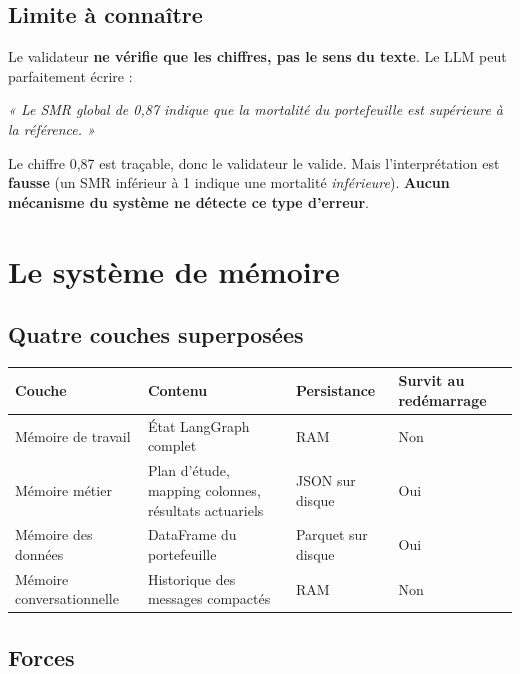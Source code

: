 \documentclass[12pt,a4paper]{article}
\begin{document}
\subsection{Limite à connaître}

\begin{weaknessbox}
Le validateur \textbf{ne vérifie que les chiffres, pas le sens du texte}.
Le LLM peut parfaitement écrire :

\medskip
\textit{« Le SMR global de 0,87 indique que la mortalité du portefeuille
est supérieure à la référence. »}
\medskip

Le chiffre 0{,}87 est traçable, donc le validateur le valide. Mais
l'interprétation est \textbf{fausse} (un SMR inférieur à 1 indique une mortalité
\emph{inférieure}). \textbf{Aucun mécanisme du système ne détecte ce type d'erreur}.
\end{weaknessbox}

\newpage

\section{Le système de mémoire}

\subsection{Quatre couches superposées}

\begin{center}
\begin{tabular}{p{3.5cm} p{4.5cm} p{3cm} p{2.5cm}}
\toprule
\textbf{Couche} & \textbf{Contenu} & \textbf{Persistance} & \textbf{Survit au redémarrage} \\
\midrule
Mémoire de travail & État LangGraph complet & RAM & Non \\
Mémoire métier & Plan d'étude, mapping colonnes, résultats actuariels & JSON sur disque & Oui \\
Mémoire des données & DataFrame du portefeuille & Parquet sur disque & Oui \\
Mémoire conversationnelle & Historique des messages compactés & RAM & Non \\
\bottomrule
\end{tabular}
\end{center}

\subsection{Forces}
\end{document}
